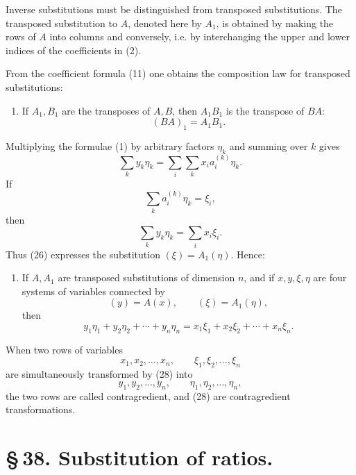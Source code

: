 \documentclass[11pt]{article}
\begin{document}
Inverse substitutions must be distinguished from transposed substitutions. The transposed substitution to $A$, denoted here by $A_1$, is obtained by making the rows of $A$ into columns and conversely, i.e. by interchanging the upper and lower indices of the coefficients in (2).

From the coefficient formula (11) one obtains the composition law for transposed substitutions:
\begin{enumerate}[label=\arabic*.,leftmargin=2.2em,start=8]
\item If $A_1,B_1$ are the transposes of $A,B$, then $A_1B_1$ is the transpose of $BA$:
\begin{equation}
(BA)_1=A_1B_1.
\tag{24}
\end{equation}
\end{enumerate}

Multiplying the formulae (1) by arbitrary factors $\eta_k$ and summing over $k$ gives
\begin{equation}
\sum_k y_k\eta_k=\sum_i\sum_k x_i a_i^{(k)}\eta_k.
\tag{25}
\end{equation}
If
\begin{equation}
\sum_k a_i^{(k)}\eta_k=\xi_i,
\tag{26}
\end{equation}
then
\begin{equation}
\sum_k y_k\eta_k=\sum_i x_i\xi_i.
\tag{27}
\end{equation}
Thus (26) expresses the substitution $(\xi)=A_1(\eta)$. Hence:
\begin{enumerate}[label=\arabic*.,leftmargin=2.2em,start=9]
\item If $A,A_1$ are transposed substitutions of dimension $n$, and if $x,y,\xi,\eta$ are four systems of variables connected by
\begin{equation}
(y)=A(x),\qquad (\xi)=A_1(\eta),
\tag{28}
\end{equation}
then
\begin{equation}
y_1\eta_1+y_2\eta_2+
\cdots+y_n\eta_n=x_1\xi_1+x_2\xi_2+
\cdots+x_n\xi_n.
\tag{29}
\end{equation}
\end{enumerate}
When two rows of variables
\[
x_1,x_2,\ldots,x_n,
\qquad
\xi_1,\xi_2,\ldots,\xi_n
\]
are simultaneously transformed by (28) into
\[
y_1,y_2,\ldots,y_n,
\qquad
\eta_1,\eta_2,\ldots,\eta_n,
\]
the two rows are called contragredient, and (28) are contragredient transformations.

\section*{\S\,38. Substitution of ratios.}
\end{document}
